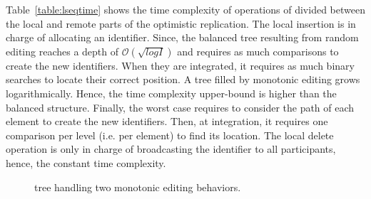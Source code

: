\begin{asparadesc}
  Table~\ref{table:lseqtime} shows the time complexity of operations of \LSEQ
  divided between the local and remote parts of the optimistic replication. The
  local insertion is in charge of allocating an identifier. Since, the balanced
  tree resulting from random editing reaches a depth of
  $\mathcal{O}(\sqrt{log I})$ and requires as much comparisons to create the new
  identifiers. When they are integrated, it requires as much binary searches to
  locate their correct position. A tree filled by monotonic editing grows
  logarithmically. Hence, the time complexity upper-bound is higher than the
  balanced structure. Finally, the worst case requires to consider the path of
  each element to create the new identifiers. Then, at integration, it requires
  one comparison per level (i.e. per element) to find its location. The local
  delete operation is only in charge of broadcasting the identifier to all
  participants, hence, the constant time complexity.


  \begin{figure*}
    \centering
    \subfloat {}
    \hspace{10pt}
    \subfloat {}
    \caption{\label{fig:lseqtreeexample}\LSEQ tree handling two monotonic
      editing behaviors.}
  \end{figure*}
  

\end{asparadesc}
